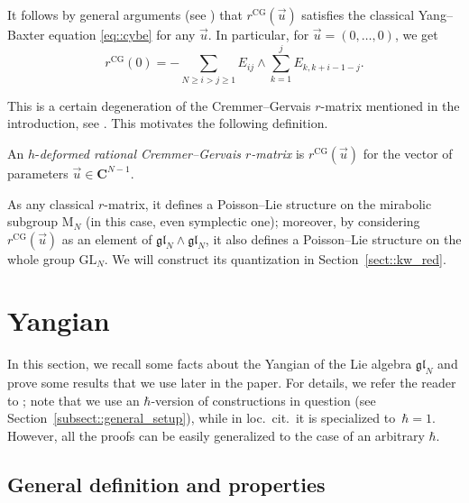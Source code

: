 \documentclass[10pt,a4paper]{article}
\numberwithin{equation}{section}
\newcommand{\CG}{\mathrm{CG}}
\newcommand{\C}{\mathbf{C}}
\newcommand{\GL}{\mathrm{GL}}
\newcommand{\rM}{\mathrm{M}}
\newcommand{\gl}{\mathfrak{gl}}
\begin{document}
	It follows by general arguments (see \cite{EtingofSchiffmannQuantumGroups}) that $r^{\CG}(\vec{u})$ satisfies the classical Yang--Baxter equation \eqref{eq::cybe} for any $\vec{u}$. In particular, for $\vec{u}=(0,\dots,0)$, we get
	\[
	r^{\CG}(0) = -\sum\limits_{N \geq i > j \geq 1} E_{ij} \wedge \sum\limits_{k=1}^j E_{k,k+i-1-j}.
	\]
	
	
	This is a certain degeneration of the Cremmer--Gervais $r$-matrix mentioned in the introduction, see \cite{EndelmanHodges}. This motivates the following definition.
	\begin{Definition}
		\label{def::cg_class_r_mat}
		An $h$-\emph{deformed rational Cremmer--Gervais $r$-matrix} is $r^{\CG}(\vec{u})$ for the vector of parameters $\vec{u}\in \C^{N-1}$.
	\end{Definition}
	
	As any classical $r$-matrix, it defines a Poisson--Lie structure on the mirabolic subgroup $\rM_N$ (in this case, even symplectic one); moreover, by considering $r^{\CG}(\vec{u})$ as an element of $\gl_N \wedge \gl_N$, it also defines a Poisson--Lie structure on the whole group $\GL_N$. We will construct its quantization in Section~\ref{sect::kw_red}.
	
	
	\section{Yangian}
	\label{sect::basics}
	
	In this section, we recall some facts about the Yangian of the Lie algebra $\gl_N$ and prove some results that we use later in the paper. For details, we refer the reader to \cite{MolevYangians}; note that we use an $\hbar$-version of constructions in question (see Section~\ref{subsect::general_setup}), while in loc.\ cit.\  it is specialized to~${\hbar=1}$. However, all the proofs can be easily generalized to the case of an arbitrary $\hbar$.
	
	\subsection{General definition and properties}
\end{document}
